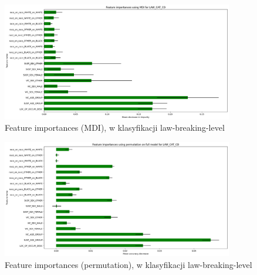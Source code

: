 \documentclass{classrep}
\begin{document}
{{{{                    \begin{figure}[!htbp]
                        \centering
                        \includegraphics[width=0.9\textwidth]{img/5.1.3/4/Feature importances using MDI for LAW_CAT_CD.png}
                        \caption{Feature importances (MDI), w klasyfikacji law-breaking-level}
                        \label{goal_1_exp_4_imp_mdi_law}
                    \end{figure}
                    
                    \begin{figure}[!htbp]
                        \centering
                        \includegraphics[width=0.9\textwidth]{img/5.1.3/4/Feature importances using permutation on full model for LAW_CAT_CD.png}
                        \caption{Feature importances (permutation), w klasyfikacji law-breaking-level}
                        \label{goal_1_exp_4_imp_perm_law}
                    \end{figure}
                    
}}}}
\end{document}
